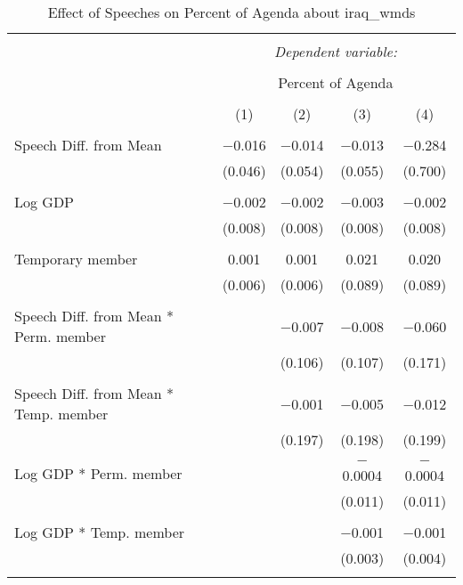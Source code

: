 
\begin{table}[!htbp] \centering 
  \caption{Effect of Speeches on Percent of Agenda about iraq_wmds} 
  \label{} 
\begin{tabular}{@{\extracolsep{5pt}}lcccc} 
\\[-1.8ex]\hline 
\hline \\[-1.8ex] 
 & \multicolumn{4}{c}{\textit{Dependent variable:}} \\ 
\cline{2-5} 
\\[-1.8ex] & \multicolumn{4}{c}{Percent of Agenda} \\ 
\\[-1.8ex] & (1) & (2) & (3) & (4)\\ 
\hline \\[-1.8ex] 
 Speech Diff. from Mean & $-$0.016 & $-$0.014 & $-$0.013 & $-$0.284 \\ 
  & (0.046) & (0.054) & (0.055) & (0.700) \\ 
  & & & & \\ 
 Log GDP & $-$0.002 & $-$0.002 & $-$0.003 & $-$0.002 \\ 
  & (0.008) & (0.008) & (0.008) & (0.008) \\ 
  & & & & \\ 
 Temporary member & 0.001 & 0.001 & 0.021 & 0.020 \\ 
  & (0.006) & (0.006) & (0.089) & (0.089) \\ 
  & & & & \\ 
 Speech Diff. from Mean * Perm. member &  & $-$0.007 & $-$0.008 & $-$0.060 \\ 
  &  & (0.106) & (0.107) & (0.171) \\ 
  & & & & \\ 
 Speech Diff. from Mean * Temp. member &  & $-$0.001 & $-$0.005 & $-$0.012 \\ 
  &  & (0.197) & (0.198) & (0.199) \\ 
  & & & & \\ 
 Log GDP * Perm. member &  &  & $-$0.0004 & $-$0.0004 \\ 
  &  &  & (0.011) & (0.011) \\ 
  & & & & \\ 
 Log GDP * Temp. member &  &  & $-$0.001 & $-$0.001 \\ 
  &  &  & (0.003) & (0.004) \\ 
  & & & & \\ 

\end{tabular}
\end{table}

